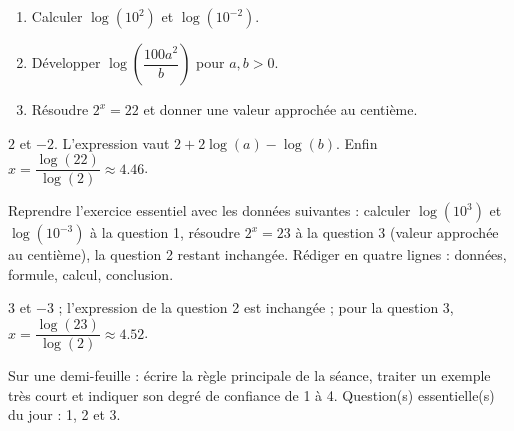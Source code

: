 \begin{exercise}[essentiel]
\begin{enumerate}\item Calculer $\log(10^2)$ et $\log(10^{-2})$.\item Développer $\log\!\left(\dfrac{100a^2}{b}\right)$ pour $a,b>0$.\item Résoudre $2^x=22$ et donner une valeur approchée au centième.\end{enumerate}
\end{exercise}
\begin{solution}$2$ et $-2$. L'expression vaut $2+2\log(a)-\log(b)$. Enfin $x=\dfrac{\log(22)}{\log(2)}\approx\num{4,46}$.\end{solution}


\begin{homework}Reprendre l'exercice essentiel avec les données suivantes : calculer $\log(10^{3})$ et $\log(10^{-3})$ à la question 1, résoudre $2^x=23$ à la question 3 (valeur approchée au centième), la question 2 restant inchangée. Rédiger en quatre lignes : données, formule, calcul, conclusion.\end{homework}
\begin{solution}$3$ et $-3$ ; l'expression de la question 2 est inchangée ; pour la question 3, $x=\dfrac{\log(23)}{\log(2)}\approx\num{4,52}$.\end{solution}

\begin{exitticket}[3 minutes]Sur une demi-feuille : écrire la règle principale de la séance, traiter un exemple très court et indiquer son degré de confiance de 1 à 4. Question(s) essentielle(s) du jour : 1, 2 et 3.\end{exitticket}

